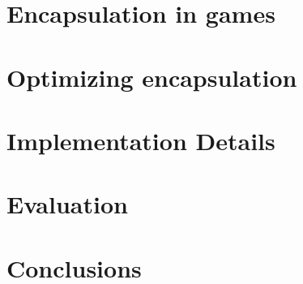 \documentclass[conference]{IEEEtran}
\begin{document}
\section{Encapsulation in games}
\label{sec:the_problem}



\section{Optimizing encapsulation}
\label{sec:idea}

 
\section{Implementation Details}
\label{sec:details}


\section{Evaluation}
\label{sec:evaluation}


\section{Conclusions}
\label{sec:conclusions_and_future_works}










\end{document}
